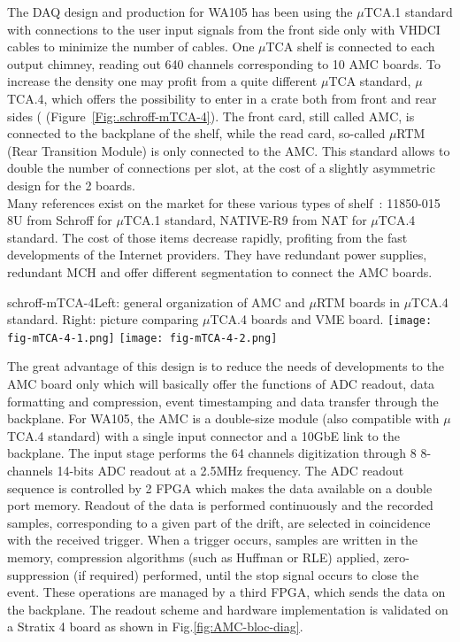 The DAQ design and production for WA105 has been using the $\mu$TCA.1 standard with connections to the user input signals from the front side only with VHDCI cables to minimize the number of cables. One $\mu$TCA shelf is connected to each output chimney, reading out 640 channels corresponding to 10 AMC boards. To increase the density one may profit from a quite different $\mu$TCA standard, $\mu$TCA.4, which offers the possibility to enter in a crate both from front and rear sides ( (Figure~\ref{Fig:.schroff-mTCA-4}). The front card, still called AMC, is connected to the backplane of the shelf, while the read card, so-called $\mu$RTM (Rear Transition Module) is only connected to the AMC. This standard allows to double the number of connections per slot, at the cost of a slightly asymmetric design for the 2 boards. \\
Many references exist on the market for these various types of shelf~: 11850-015 8U from Schroff for $\mu$TCA.1 standard, NATIVE-R9 from NAT for $\mu$TCA.4 standard. The cost of those items decrease rapidly, profiting from the fast developments of the Internet providers. They have redundant power supplies, redundant MCH and offer different segmentation to connect the AMC boards.  


\begin{cdrfigure}{schroff-mTCA-4}{\small Left: general organization of AMC and $\mu$RTM boards in $\mu$TCA.4 standard. Right: picture comparing $\mu$TCA.4 boards and VME board.}
\texttt{[image: fig-mTCA-4-1.png]} \hfill
\texttt{[image: fig-mTCA-4-2.png]}
\end{cdrfigure}


The great advantage of this design is to reduce the needs of developments to the AMC board only which will basically offer the functions of ADC readout, data formatting and compression, event timestamping and data transfer through the backplane. For WA105, the AMC is a double-size module (also compatible with $\mu$TCA.4 standard) with a single input connector and a 10GbE link to the backplane. The input stage performs the 64 channels digitization through 8 8-channels 14-bits ADC readout at a 2.5MHz frequency. The ADC readout sequence is controlled by 2 FPGA which makes the data available on a double port memory. Readout of the data is performed continuously and the recorded samples, corresponding to a given part of the drift, are selected in coincidence with the received trigger. When a trigger occurs, samples are written in the memory, compression algorithms (such as Huffman or RLE) applied, zero-suppression (if required) performed, until the stop signal occurs to close the event. These operations are managed by a third FPGA, which sends the data on the backplane.  The readout scheme and hardware implementation is validated on a Stratix 4 board as shown in Fig.\ref{fig:AMC-bloc-diag}.

